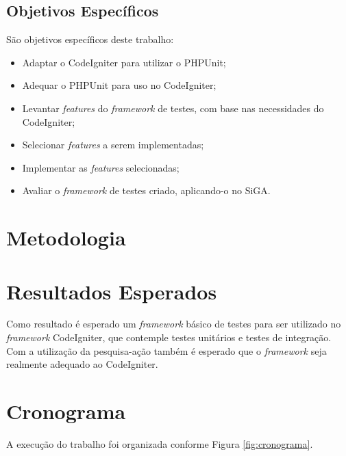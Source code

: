 \subsection{Objetivos Específicos}

São objetivos específicos deste trabalho:

\begin{itemize}
 \item Adaptar o CodeIgniter para utilizar o PHPUnit;
 \item Adequar o PHPUnit para uso no CodeIgniter;
 \item Levantar \textit{features} do \textit{framework} de testes, com base nas necessidades do CodeIgniter;
 \item Selecionar \textit{features} a serem implementadas;
 \item Implementar as \textit{features} selecionadas;
 \item Avaliar o \textit{framework} de testes criado, aplicando-o no SiGA.
\end{itemize}


\section{Metodologia}

  

\section{Resultados Esperados}

Como resultado é esperado um \textit{framework} básico de testes para ser utilizado no \textit{framework} CodeIgniter, que contemple
testes unitários e testes de integração. Com a utilização da pesquisa-ação também é esperado que o \textit{framework} seja realmente adequado
ao CodeIgniter. 

\section{Cronograma}

A execução do trabalho foi organizada conforme Figura \ref{fig:cronograma}.

